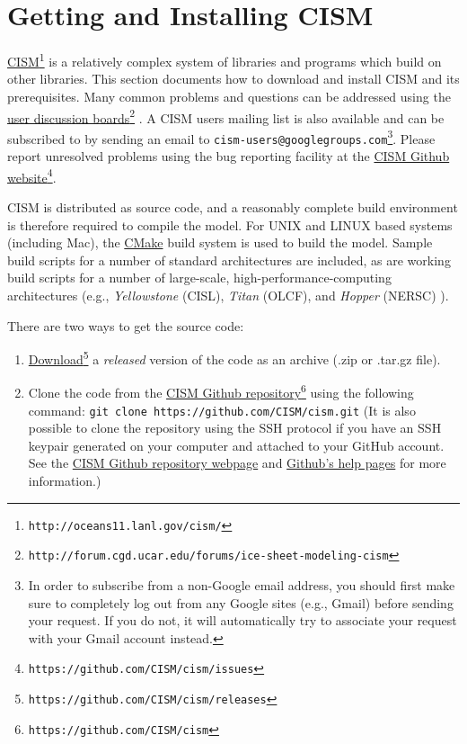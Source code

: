 
\section{Getting and Installing CISM}
\label{sec:getcode}

\href{http://oceans11.lanl.gov/cism/}{CISM}\footnote{\texttt{http://oceans11.lanl.gov/cism/}} 
is a relatively complex system of libraries and programs which build on other libraries. 
This section documents how to download and install CISM and its prerequisites.
Many common problems and questions can be addressed using the 
\href{http://forum.cgd.ucar.edu/forums/ice-sheet-modeling-cism}{user discussion boards}\footnote{\texttt{http://forum.cgd.ucar.edu/forums/ice-sheet-modeling-cism}}
. 
A CISM users mailing list is also available and can be subscribed to by sending an email
to \texttt{cism-users@googlegroups.com}\footnote{In order to subscribe from a non-Google email
address, you should first make sure to completely log out from any Google sites (e.g., Gmail) before sending 
your request. If you do not, it will automatically try to associate your request with your Gmail account instead.}.
Please report unresolved problems using the bug reporting facility at the 
\href{https://github.com/CISM/cism/issues}{CISM Github website}\footnote{\texttt{https://github.com/CISM/cism/issues}}. 

CISM is distributed as source code, and a reasonably complete build environment is therefore required to compile the model. 
For UNIX and LINUX based systems (including Mac), the \href{http://www.cmake.org/}{CMake} build system is used to build the model. 
Sample build scripts for a number of standard architectures are included, as are working build scripts 
for a number of large-scale, high-performance-computing architectures 
(e.g., \textit{Yellowstone} (CISL), \textit{Titan} (OLCF), and \textit{Hopper} (NERSC) ). 

There are two ways to get the source code:

\begin{enumerate}

\item \href{https://github.com/CISM/cism/releases}{Download}\footnote{\texttt{https://github.com/CISM/cism/releases}} a {\it released} version of the code as an archive (.zip or .tar.gz file).
\item Clone the code from the \href{https://github.com/CISM/cism}{CISM Github repository}\footnote{\texttt{https://github.com/CISM/cism}} using the following command: 
\texttt{git clone https://github.com/CISM/cism.git}
(It is also possible to clone the repository using the SSH protocol 
if you have an SSH keypair generated on your computer and attached to your GitHub account.  
See the \href{https://github.com/CISM/cism}{CISM Github repository webpage} and 
\href{https://help.github.com/articles/which-remote-url-should-i-use}{Github's help pages} for more information.)

\end{enumerate}

